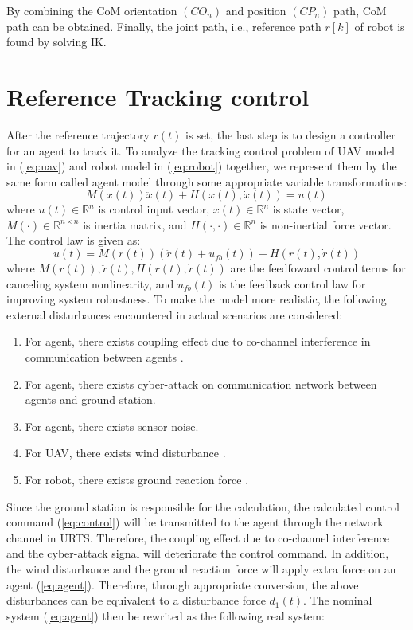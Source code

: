 \documentclass{ieeeaccess}
\begin{document}
By combining the CoM orientation $(CO_n)$ and position $(CP_n)$ path, CoM path can be obtained. Finally, the joint path, i.e., reference path $r[k]$ of robot is found by solving IK.

\section{Reference Tracking control}
After the reference trajectory $r(t)$ is set, the last step is to design a controller for an agent to track it. To analyze the tracking control problem of UAV model in (\ref{eq:uav}) and robot model in (\ref{eq:robot}) together, we represent them by the same form called agent model through some appropriate variable transformations:
\begin{equation} \label{eq:agent} 
    M(x(t))\ddot{x}(t) + H(x(t),\dot{x}(t)) = u(t)
\end{equation}
where $u(t)\in\mathbb{R}^n$ is control input vector, $x(t)\in\mathbb{R}^n$ is state vector, $M(\cdot)\in\mathbb{R}^{n\times n}$ is inertia matrix, and $H(\cdot, \cdot)\in\mathbb{R}^n$ is non-inertial force vector. The control law is given as:
\begin{equation} \label{eq:control}
    u(t)= M(r(t))(\ddot{r}(t) + u_{fb}(t)) + H(r(t),\dot{r}(t)) 
\end{equation}
where $M(r(t)),\ddot{r}(t),H(r(t),\dot{r}(t))$ are the feedfoward control terms for canceling system nonlinearity, and $u_{fb}(t)$ is the feedback control law for improving system robustness. To make the model more realistic, the following external disturbances encountered in actual scenarios are considered:
\begin{enumerate}
    \item For agent, there exists coupling effect due to co-channel interference in communication between agents \cite{9448458}.
    \item For agent, there exists cyber-attack on communication network between agents and ground station.
    \item For agent, there exists sensor noise.
    \item For UAV, there exists wind disturbance \cite{9075385}.
    \item For robot, there exists ground reaction force \cite{chen2013human}. 
\end{enumerate}
Since the ground station is responsible for the calculation, the calculated control command (\ref{eq:control}) will be transmitted to the agent through the network channel in URTS. Therefore, the coupling effect due to co-channel interference and the cyber-attack signal will deteriorate the control command. In addition, the wind disturbance and the ground reaction force will apply extra force on an agent (\ref{eq:agent}). Therefore, through appropriate conversion, the above disturbances can be equivalent to a disturbance force $d_1(t)$. The nominal system (\ref{eq:agent}) then be rewrited as the following real system:
\end{document}
